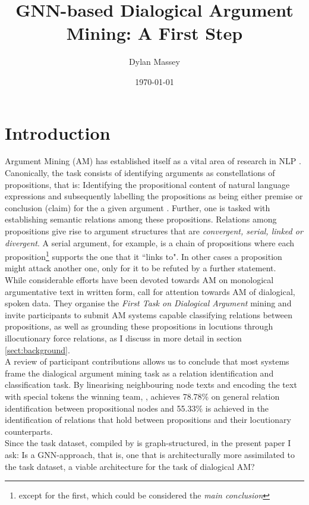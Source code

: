 \documentclass[11pt]{article}
\title{GNN-based Dialogical Argument Mining: A First Step} %
\author{Dylan Massey} %
\date{\today} %
\begin{document}
\maketitle

\section{Introduction}
\label{sect:intro}

Argument Mining (AM) has established itself as a vital area of research in NLP \citep{stede_argumentation_2019}. Canonically, the task consists of identifying arguments as constellations of propositions, that is: Identifying the propositional content of natural language expressions and subsequently labelling the propositions as being either premise or conclusion (claim) for the a given argument \citep{stede_argumentation_2019}. Further, one is tasked with establishing semantic relations among these propositions. Relations among propositions give rise to argument structures that are \textit{convergent, serial, linked or divergent}\citep{lawrence_argument_2019}. A serial argument, for example, is a chain of propositions where each proposition\footnote{except for the first, which could be considered the \textit{main conclusion}} supports the one that it ``links to". In other cases a proposition might attack another one, only for it to be refuted by a further statement. \\
While considerable efforts have been devoted towards AM on monological argumentative text in written form, \citet{ruiz-dolz_overview_2024} call for attention towards AM of dialogical, spoken data. They organise the \textit{First Task on Dialogical Argument} mining and invite participants to submit AM systems capable classifying relations between propositions, as well as grounding these propositions in locutions through illocutionary force relations, as I discuss in more detail in section \ref{sect:background}. \\
A review of participant contributions allows us to conclude that most systems frame the dialogical argument mining task as a relation identification and classification task. By linearising neighbouring node texts and encoding the text with special tokens the winning team, \citet{binder_dfki-mlst_2024}, achieves 78.78\% on general relation identification between propositional nodes and 55.33\% is achieved in the identification of relations that hold between propositions and their locutionary counterparts. \\
Since the task dataset, compiled by \citet{hautli-janisz_qt30_2022} is graph-structured, in the present paper I ask: Is a GNN-approach, that is, one that is architecturally more assimilated to the task dataset, a viable architecture for the task of dialogical AM?
\end{document}
